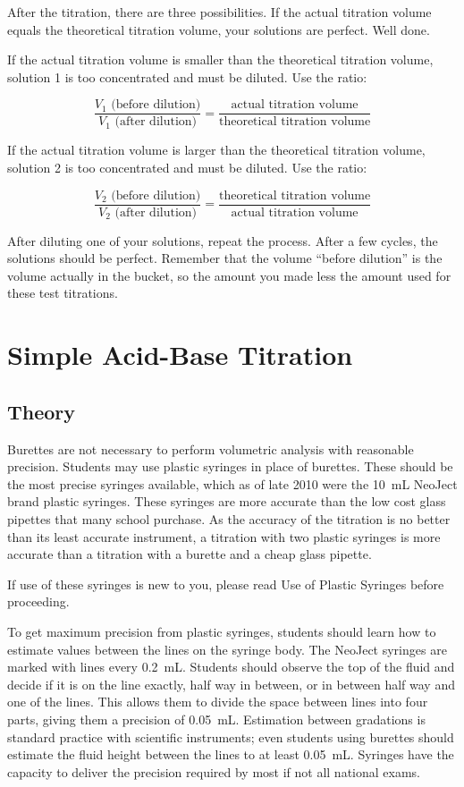 After the titration, there are three possibilities. If the actual titration volume equals the theoretical titration volume, your solutions are perfect. Well done.

If the actual titration volume is smaller than the theoretical titration volume, solution 1 is too concentrated and must be diluted. Use the ratio:

\[ \frac{V_{1} \mbox{ (before dilution)}}{V_{1} \mbox{ (after dilution)}} = \frac{\mbox{actual titration volume}}{\mbox{theoretical titration volume}} \]

If the actual titration volume is larger than the theoretical titration volume, solution 2 is too concentrated and must be diluted. Use the ratio:

\[ \frac{V_{2} \mbox{ (before dilution)}}{V_{2} \mbox{ (after dilution)}} = \frac{\mbox{theoretical titration volume}}{\mbox{actual titration volume}} \]

After diluting one of your solutions, repeat the process. After a few cycles, the solutions should be perfect. Remember that the volume ``before dilution'' is the volume actually in the bucket, so the amount you made less the amount used for these test titrations.

\section{Simple Acid-Base Titration}

\subsection{Theory}

Burettes are not necessary to perform volumetric analysis with reasonable precision. Students may use plastic syringes in place of burettes. These should be the most precise syringes available, which as of late 2010 were the 10~mL NeoJect brand plastic syringes. These syringes are more accurate than the low cost glass pipettes that many school purchase. As the accuracy of the titration is no better than its least accurate instrument, a titration with two plastic syringes is more accurate than a titration with a burette and a cheap glass pipette.

If use of these syringes is new to you, please read Use of Plastic Syringes before proceeding.

To get maximum precision from plastic syringes, students should learn how to estimate values between the lines on the syringe body. The NeoJect syringes are marked with lines every 0.2~mL. Students should observe the top of the fluid and decide if it is on the line exactly, half way in between, or in between half way and one of the lines. This allows them to divide the space between lines into four parts, giving them a precision of 0.05~mL. Estimation between gradations is standard practice with scientific instruments; even students using burettes should estimate the fluid height between the lines to at least 0.05~mL. Syringes have the capacity to deliver the precision required by most if not all national exams.

